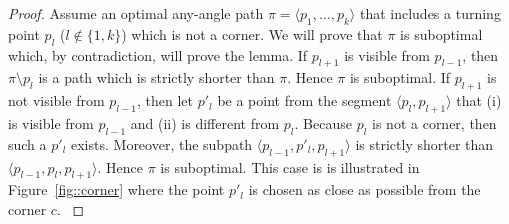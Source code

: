 \begin{proof}
{
  Assume an optimal any-angle path $\pi = \langle p_1,\dots,p_k \rangle$ 
  that includes a turning point $p_l$ ($l \not\in \{1,k\}$) 
  which is not a corner.  
  We will prove that $\pi$ is suboptimal 
  which, by contradiction, will prove the lemma.  
  If $p_{l+1}$ is visible from $p_{l-1}$, 
  then  $\pi \setminus p_l$ is a path 
  which is strictly shorter than $\pi$.  
  Hence $\pi$ is suboptimal.  
  If $p_{l+1}$ is not visible from $p_{l-1}$, 
  then let $p'_{l}$ be a point from the segment $\langle p_l,p_{l+1} \rangle$ 
  that (i) is visible from $p_{l-1}$ 
  and (ii) is different from $p_l$.  
  Because $p_l$ is not a corner, 
  then such a $p'_l$ exists.  
  Moreover, the subpath $\langle p_{l-1}, p'_{l}, p_{l+1} \rangle$ is 
  strictly shorter than $\langle p_{l-1}, p_{l}, p_{l+1}\rangle$. 
  Hence $\pi$ is suboptimal.
  This case is is illustrated in Figure~\ref{fig::corner}  
  where the point $p'_l$ is chosen as close as possible from the corner $c$.  
}
\end{proof}
